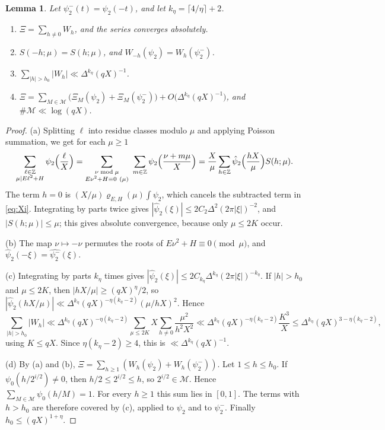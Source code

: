 \documentclass[11pt]{amsart}
\newtheorem{lemma}[theorem]{Lemma}
\theoremstyle{remark}
\theoremstyle{definition}
\numberwithin{equation}{section}
\newcommand{\Mset}{\mathcal{M}}
\newcommand{\Z}{\mathbb{Z}}
\begin{document}
\begin{lemma}\label{lem:poisson}
Let $\psi_2^-(t)=\psi_2(-t)$, and let $k_\eta=\lceil4/\eta\rceil+2$.
\begin{enumerate}
\item[(a)] $\Xi=\sum_{h\ne0}W_h$, and the series converges absolutely.
\item[(b)] $S(-h;\mu)=S(h;\mu)$, and $W_{-h}(\psi_2)=W_h(\psi_2^-)$.
\item[(c)] $\sum_{|h|>h_0}|W_h|\ll\Delta^{k_\eta}(qX)^{-1}$.
\item[(d)] $\Xi=\sum_{M\in\Mset}\bigl(\Xi_M(\psi_2)+\Xi_M(\psi_2^-)\bigr)+O\bigl(\Delta^{k_\eta}(qX)^{-1}\bigr)$, and $\#\Mset\ll\log(qX)$.
\end{enumerate}
\end{lemma}

\begin{proof}
(a) Splitting $\ell$ into residue classes modulo $\mu$ and applying Poisson summation, we get for each $\mu\ge1$
\[
\sum_{\substack{\ell\in\Z\\ \mu\mid E\ell^2+H}}\psi_2\Bigl(\frac\ell X\Bigr)=\sum_{\substack{\nu\bmod\mu\\ E\nu^2+H\equiv0\ (\mu)}}\ \sum_{m\in\Z}\psi_2\Bigl(\frac{\nu+m\mu}X\Bigr)=\frac X\mu\sum_{h\in\Z}\hat\psi_2\Bigl(\frac{hX}\mu\Bigr)S(h;\mu).
\]
The term $h=0$ is $(X/\mu)\varrho_{E,H}(\mu)\int\psi_2$, which cancels the subtracted term in \eqref{eq:Xi}. Integrating by parts twice gives $|\hat\psi_2(\xi)|\le2C_2\Delta^2(2\pi|\xi|)^{-2}$, and $|S(h;\mu)|\le\mu$; this gives absolute convergence, because only $\mu\le2K$ occur.

(b) The map $\nu\mapsto-\nu$ permutes the roots of $E\nu^2+H\equiv0\pmod\mu$, and $\hat\psi_2(-\xi)=\widehat{\psi_2^-}(\xi)$.

(c) Integrating by parts $k_\eta$ times gives $|\hat\psi_2(\xi)|\le2C_{k_\eta}\Delta^{k_\eta}(2\pi|\xi|)^{-k_\eta}$. If $|h|>h_0$ and $\mu\le2K$, then $|hX/\mu|\ge(qX)^\eta/2$, so $|\hat\psi_2(hX/\mu)|\ll\Delta^{k_\eta}(qX)^{-\eta(k_\eta-2)}(\mu/hX)^2$. Hence
\[
\sum_{|h|>h_0}|W_h|\ll\Delta^{k_\eta}(qX)^{-\eta(k_\eta-2)}\sum_{\mu\le2K}X\sum_{h\ne0}\frac{\mu^2}{h^2X^2}\ll\Delta^{k_\eta}(qX)^{-\eta(k_\eta-2)}\frac{K^3}{X}\le\Delta^{k_\eta}(qX)^{3-\eta(k_\eta-2)},
\]
using $K\le qX$. Since $\eta(k_\eta-2)\ge4$, this is $\ll\Delta^{k_\eta}(qX)^{-1}$.

(d) By (a) and (b), $\Xi=\sum_{h\ge1}(W_h(\psi_2)+W_h(\psi_2^-))$. Let $1\le h\le h_0$. If $\psi_0(h/2^{i/2})\ne0$, then $h/2\le2^{i/2}\le h$, so $2^{i/2}\in\Mset$. Hence $\sum_{M\in\Mset}\psi_0(h/M)=1$. For every $h\ge1$ this sum lies in $[0,1]$. The terms with $h>h_0$ are therefore covered by (c), applied to $\psi_2$ and to $\psi_2^-$. Finally $h_0\le(qX)^{1+\eta}$.
\end{proof}
\end{document}
